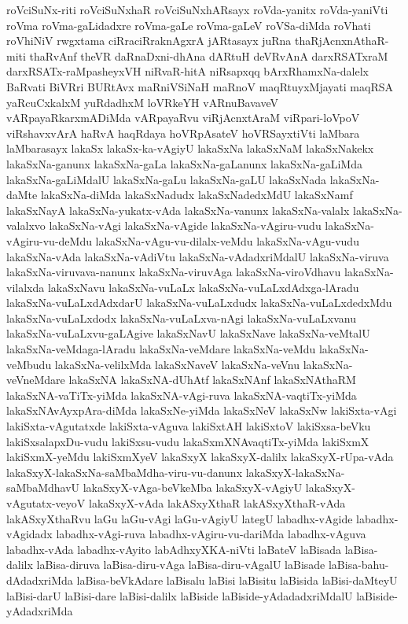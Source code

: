 {roVciSuNx-riti
roVciSuNxhaR
roVciSuNxhARsayx
roVda-yanitx
roVda-yaniVti
roVma
roVma-gaLidadxre
roVma-gaLe
roVma-gaLeV
roVSa-diMda
roVhati
roVhiNiV
rwgxtama
ciRraciRraknAgxrA
jARtasayx
juRna
thaRjAcnxnAthaR-miti
thaRvAnf
theVR
daRnaDxni-dhAna
dARtuH
deVRvAnA
darxRSATxraM
darxRSATx-raMpasheyxVH
niRvaR-hitA
niRsapxqq
bArxRhamxNa-dalelx
BaRvati
BiVRri
BURtAvx
maRniVSiNaH
maRnoV
maqRtuyxMjayati
maqRSA
yaRcuCxkalxM
yuRdadhxM
loVRkeYH
vARnuBavaveV
vARpayaRkarxmADiMda
vARpayaRvu
viRjAcnxtAraM
viRpari-loVpoV
viRshavxvArA
haRvA
haqRdaya
hoVRpAsateV
hoVRSayxtiVti
laMbara
laMbarasayx
lakaSx
lakaSx-ka-vAgiyU
lakaSxNa
lakaSxNaM
lakaSxNakekx
lakaSxNa-ganunx
lakaSxNa-gaLa
lakaSxNa-gaLanunx
lakaSxNa-gaLiMda
lakaSxNa-gaLiMdalU
lakaSxNa-gaLu
lakaSxNa-gaLU
lakaSxNada
lakaSxNa-daMte
lakaSxNa-diMda
lakaSxNadudx
lakaSxNadedxMdU
lakaSxNamf
lakaSxNayA
lakaSxNa-yukatx-vAda
lakaSxNa-vanunx
lakaSxNa-valalx
lakaSxNa-valalxvo
lakaSxNa-vAgi
lakaSxNa-vAgide
lakaSxNa-vAgiru-vudu
lakaSxNa-vAgiru-vu-deMdu
lakaSxNa-vAgu-vu-dilalx-veMdu
lakaSxNa-vAgu-vudu
lakaSxNa-vAda
lakaSxNa-vAdiVtu
lakaSxNa-vAdadxriMdalU
lakaSxNa-viruva
lakaSxNa-viruvava-nanunx
lakaSxNa-viruvAga
lakaSxNa-viroVdhavu
lakaSxNa-vilalxda
lakaSxNavu
lakaSxNa-vuLaLx
lakaSxNa-vuLaLxdAdxga-lAradu
lakaSxNa-vuLaLxdAdxdarU
lakaSxNa-vuLaLxdudx
lakaSxNa-vuLaLxdedxMdu
lakaSxNa-vuLaLxdodx
lakaSxNa-vuLaLxva-nAgi
lakaSxNa-vuLaLxvanu
lakaSxNa-vuLaLxvu-gaLAgive
lakaSxNavU
lakaSxNave
lakaSxNa-veMtalU
lakaSxNa-veMdaga-lAradu
lakaSxNa-veMdare
lakaSxNa-veMdu
lakaSxNa-veMbudu
lakaSxNa-velilxMda
lakaSxNaveV
lakaSxNa-veVnu
lakaSxNa-veVneMdare
lakaSxNA
lakaSxNA-dUhAtf
lakaSxNAnf
lakaSxNAthaRM
lakaSxNA-vaTiTx-yiMda
lakaSxNA-vAgi-ruva
lakaSxNA-vaqtiTx-yiMda
lakaSxNAvAyxpAra-diMda
lakaSxNe-yiMda
lakaSxNeV
lakaSxNw
lakiSxta-vAgi
lakiSxta-vAgutatxde
lakiSxta-vAguva
lakiSxtAH
lakiSxtoV
lakiSxsa-beVku
lakiSxsalapxDu-vudu
lakiSxsu-vudu
lakaSxmXNAvaqtiTx-yiMda
lakiSxmX
lakiSxmX-yeMdu
lakiSxmXyeV
lakaSxyX
lakaSxyX-dalilx
lakaSxyX-rUpa-vAda
lakaSxyX-lakaSxNa-saMbaMdha-viru-vu-danunx
lakaSxyX-lakaSxNa-saMbaMdhavU
lakaSxyX-vAga-beVkeMba
lakaSxyX-vAgiyU
lakaSxyX-vAgutatx-veyoV
lakaSxyX-vAda
lakASxyXthaR
lakASxyXthaR-vAda
lakASxyXthaRvu
laGu
laGu-vAgi
laGu-vAgiyU
lategU
labadhx-vAgide
labadhx-vAgidadx
labadhx-vAgi-ruva
labadhx-vAgiru-vu-dariMda
labadhx-vAguva
labadhx-vAda
labadhx-vAyito
labAdhxyXKA-niVti
laBateV
laBisada
laBisa-dalilx
laBisa-diruva
laBisa-diru-vAga
laBisa-diru-vAgalU
laBisade
laBisa-bahu-dAdadxriMda
laBisa-beVkAdare
laBisalu
laBisi
laBisitu
laBisida
laBisi-daMteyU
laBisi-darU
laBisi-dare
laBisi-dalilx
laBiside
laBiside-yAdadadxriMdalU
laBiside-yAdadxriMda
}
